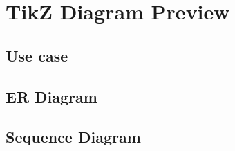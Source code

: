 \documentclass[12pt]{article}
\begin{document}
\section*{TikZ Diagram Preview}

\subsection*{Use case}
\centering
\resizebox{\textwidth}{!}{}

\newpage
\subsection*{ER Diagram}
\centering
\resizebox{\textwidth}{!}{}

\newpage
\subsection*{Sequence Diagram}
\centering
\resizebox{\textwidth}{!}{}
\end{document}
